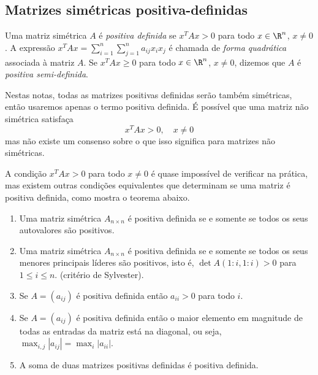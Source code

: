 \documentclass{article}
\begin{document}
\subsection{Matrizes simétricas positiva-definidas}

\begin{defn}
    Uma matriz simétrica \(A\) é \emph{positiva definida} se \(x^T A x > 0\) para todo \(x \in \R^n\), \(x \neq 0\). A expressão \(x^T A x = \sum_{i=1}^n \sum_{j=1}^n a_{ij} x_i x_j\) é chamada de \emph{forma quadrática} associada à matriz \(A\). Se \(x^T A x \geq 0\) para todo \(x \in \R^n\), \(x \neq 0\), dizemos que \(A\) é \emph{positiva semi-definida}.
\end{defn}

\begin{rem}
    Nestas notas, todas as matrizes positivas definidas serão também simétricas, então usaremos apenas o termo positiva definida. É possível que uma matriz não simétrica satisfaça
    \[
        x^T A x > 0, \quad x \neq 0
    \]
    mas não existe um consenso sobre o que isso significa para matrizes não simétricas.
\end{rem}

A condição \(x^T A x > 0\) para todo \(x \neq 0\) é quase impossível de verificar na prática, mas existem outras condições equivalentes que determinam se uma matriz é positiva definida, como mostra o teorema abaixo.

\begin{thm}\label{thm:positiva_definida}
    \begin{enumerate}
        \item Uma matriz simétrica \(A_{n \times n}\) é positiva definida se e somente se todos os seus autovalores são positivos.
        \item Uma matriz simétrica \(A_{n \times n}\) é positiva definida se e somente se todos os seus menores principais líderes são positivos, isto é, \(\det A(1:i, 1:i) > 0\) para \(1 \leq i \leq n\). (critério de Sylvester).
        \item Se \(A = (a_{ij})\) é positiva definida então \(a_{ii} > 0\) para todo \(i\).
        \item Se \(A = (a_{ij})\) é positiva definida então o maior elemento em magnitude de todas as entradas da matriz está na diagonal, ou seja, \(\max_{i,j} |a_{ij}| = \max_i |a_{ii}|\).
        \item A soma de duas matrizes positivas definidas é positiva definida.
    \end{enumerate} 
\end{thm}
\end{document}
